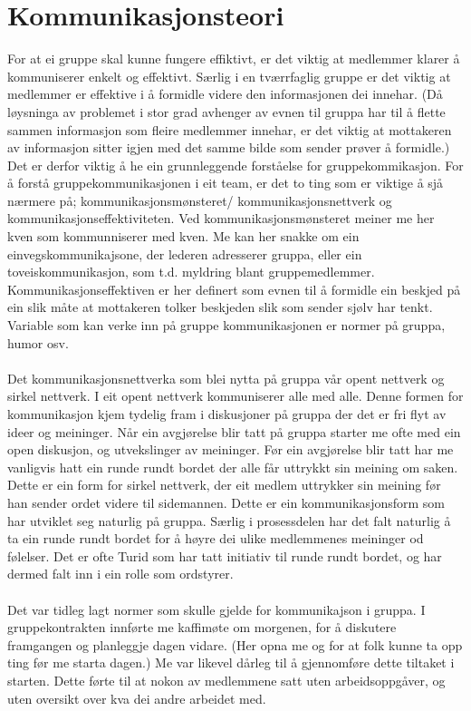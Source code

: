 \section{Kommunikasjonsteori}
%
%
For at ei gruppe skal kunne fungere effiktivt, er det viktig at medlemmer klarer å kommuniserer enkelt og effektivt. Særlig i en tværrfaglig gruppe er det viktig at medlemmer er effektive i å formidle videre den informasjonen dei innehar. (Då løysninga av problemet i stor grad avhenger av evnen til gruppa har til å flette sammen informasjon som fleire medlemmer innehar, er det viktig at mottakeren av informasjon sitter igjen med det samme bilde som sender prøver å formidle.) Det er derfor viktig å he ein grunnleggende forståelse for gruppekommikasjon.
For å forstå gruppekommunikasjonen i eit team, er det to ting som er viktige å sjå nærmere på; kommunikasjonsmønsteret/ kommunikasjonsnettverk og kommunikasjonseffektiviteten. Ved kommunikasjonsmønsteret meiner me her kven som kommunniserer med kven. Me kan her snakke om ein einvegskommunikajsone, der lederen adresserer gruppa, eller ein toveiskommunikasjon, som t.d. myldring blant gruppemedlemmer. Kommunikasjonseffektiven er her definert som evnen til å formidle ein beskjed på ein slik måte at mottakeren tolker beskjeden slik som sender sjølv har tenkt.
Variable som kan verke inn på gruppe kommunikasjonen er normer på gruppa, humor osv.
\\
\\
Det kommunikasjonsnettverka som blei nytta på gruppa vår opent nettverk og sirkel nettverk. I eit opent nettverk kommuniserer alle med alle. Denne formen for kommunikasjon kjem tydelig fram i diskusjoner på gruppa der det er fri flyt av ideer og meininger. Når ein avgjørelse blir tatt på gruppa starter me ofte med ein open diskusjon, og utvekslinger av meininger. Før ein avgjørelse blir tatt har me vanligvis hatt ein runde rundt bordet der alle får uttrykkt sin meining om saken. Dette er ein form for sirkel nettverk, der eit medlem uttrykker sin meining før han sender ordet videre til sidemannen. Dette er ein kommunikasjonsform som har utviklet seg naturlig på gruppa. Særlig i prosessdelen har det falt naturlig å ta ein runde rundt bordet for å høyre dei ulike medlemmenes meininger od følelser. Det er ofte Turid som har tatt initiativ til runde rundt bordet, og har dermed falt inn i ein rolle som ordstyrer. 
\\
\\
Det var tidleg lagt normer som skulle gjelde for kommunikajson i gruppa. I gruppekontrakten innførte me kaffimøte om morgenen, for å diskutere framgangen og planleggje dagen vidare. (Her opna me og for at folk kunne ta opp ting før me starta dagen.) Me var likevel dårleg til å gjennomføre dette tiltaket i starten. Dette førte til at nokon av medlemmene satt uten arbeidsoppgåver, og uten oversikt over kva dei andre arbeidet med. 
